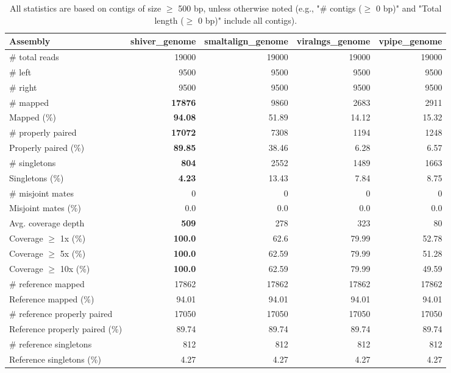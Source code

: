 \documentclass[12pt,a4paper]{article}
\begin{document}
\begin{table}[ht]
\begin{center}
\caption{All statistics are based on contigs of size $\geq$ 500 bp, unless otherwise noted (e.g., "\# contigs ($\geq$ 0 bp)" and "Total length ($\geq$ 0 bp)" include all contigs).}
\begin{tabular}{|l*{4}{|r}|}
\hline
Assembly & shiver\_genome & smaltalign\_genome & viralngs\_genome & vpipe\_genome \\ \hline
\# total reads & 19000 & 19000 & 19000 & 19000 \\ \hline
\# left & 9500 & 9500 & 9500 & 9500 \\ \hline
\# right & 9500 & 9500 & 9500 & 9500 \\ \hline
\# mapped & {\bf 17876} & 9860 & 2683 & 2911 \\ \hline
Mapped (\%) & {\bf 94.08} & 51.89 & 14.12 & 15.32 \\ \hline
\# properly paired & {\bf 17072} & 7308 & 1194 & 1248 \\ \hline
Properly paired (\%) & {\bf 89.85} & 38.46 & 6.28 & 6.57 \\ \hline
\# singletons & {\bf 804} & 2552 & 1489 & 1663 \\ \hline
Singletons (\%) & {\bf 4.23} & 13.43 & 7.84 & 8.75 \\ \hline
\# misjoint mates & 0 & 0 & 0 & 0 \\ \hline
Misjoint mates (\%) & 0.0 & 0.0 & 0.0 & 0.0 \\ \hline
Avg. coverage depth & {\bf 509} & 278 & 323 & 80 \\ \hline
Coverage $\geq$ 1x (\%) & {\bf 100.0} & 62.6 & 79.99 & 52.78 \\ \hline
Coverage $\geq$ 5x (\%) & {\bf 100.0} & 62.59 & 79.99 & 51.28 \\ \hline
Coverage $\geq$ 10x (\%) & {\bf 100.0} & 62.59 & 79.99 & 49.59 \\ \hline
\# reference mapped & 17862 & 17862 & 17862 & 17862 \\ \hline
Reference mapped (\%) & 94.01 & 94.01 & 94.01 & 94.01 \\ \hline
\# reference properly paired & 17050 & 17050 & 17050 & 17050 \\ \hline
Reference properly paired (\%) & 89.74 & 89.74 & 89.74 & 89.74 \\ \hline
\# reference singletons & 812 & 812 & 812 & 812 \\ \hline
Reference singletons (\%) & 4.27 & 4.27 & 4.27 & 4.27 \\ \hline

\end{tabular}
\end{center}
\end{table}
\end{document}
